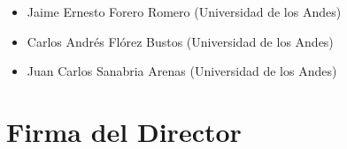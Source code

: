 \documentclass[12pt]{article}
\begin{document}
\begin{itemize}
	\item Jaime Ernesto Forero Romero (Universidad de los Andes)
	\item Carlos Andrés Flórez Bustos (Universidad de los Andes)
	\item Juan Carlos Sanabria Arenas (Universidad de los Andes)
\end{itemize}


{}


\section*{Firma del Director}
\vspace{1.5cm}
\end{document}
